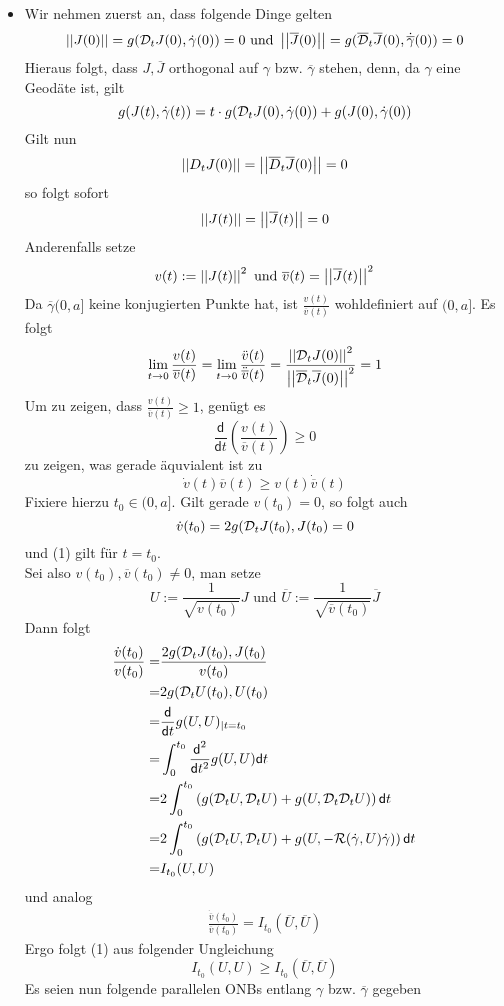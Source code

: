 \documentclass{book}
\renewcommand{\d}{\textsf{d}}
\renewcommand{\l}[1]{\overline{#1}}
\newcommand{\Rc}{\mathcal{R}}
\begin{document}
\begin{Beweis}{}
\begin{itemize}
\item Wir nehmen zuerst an, dass folgende Dinge gelten
\[ \norm{J(0)} = g(\D_t J(0), \dot{\gamma}(0)) = 0 \text{ und } \norm{\l J(0)} = g(\l \D_t \l J(0), \dot{\l \gamma}(0)) = 0 \]
Hieraus folgt, dass $J,\l J$ orthogonal auf $\gamma$ bzw. $\l \gamma$ stehen, denn, da $\gamma$ eine Geodäte ist, gilt
\[ g(J(t), \dot{\gamma}(t)) = t \cdot g(\mathcal{D}_tJ(0), \dot{\gamma}(0)) + g(J(0), \dot{\gamma}(0)) \]
Gilt nun
\[ \norm{D_t J(0)} = \norm{\l D_t \l J(0)} = 0 \]
so folgt sofort
\[\norm{J(t)} = \norm{\l J(t)} = 0 \]
Anderenfalls setze
\[ v(t) := \norm{J(t)}^2 \text{ und } \l v(t) = \norm{\l J(t)}^2 \]
Da $\l \gamma(0,a]$ keine konjugierten Punkte hat, ist $\frac{v(t)}{\l v(t)}$ wohldefiniert auf $(0,a]$. Es folgt
\[ \lim_{t \pfeil{} 0} \frac{v(t)}{\l v(t)} = \lim_{t \pfeil{} 0} \frac{\ddot{v}(t)}{\ddot{\l{v}}(t)} = \frac{\norm{\D_tJ(0)}^2}{\norm{\l \D_t \l J(0)}^2} = 1 \] 
Um zu zeigen, dass $\frac{v(t)}{\l v(t)} \geq 1$, genügt es
\[ \frac{\d}{\d t} (\frac{v(t)}{\l v(t)}) \geq 0 \]
zu zeigen, was gerade äquvialent ist zu
\[ \tag{1} \dot{v}(t) \l v(t) \geq v(t) \dot{\l v}(t) \]
Fixiere hierzu $t_0 \in (0,a]$. Gilt gerade $v(t_0) = 0$, so folgt auch
\[ \dot{v}(t_0) = 2g(\mathcal{D}_t J(t_0), J(t_0) = 0\]
und (1) gilt für $t = t_0$.\\
Sei also $v(t_0), \l v(t_0) \neq 0$, man setze
\[ U := \frac{1}{\sqrt{v(t_0)}}J \text{  und  } \l U :=  \frac{1}{\sqrt{\l v(t_0)}}\l J  \]
Dann folgt
\begin{align*}
\frac{\dot{v}(t_0)}{v(t_0)} =&\frac{2g(\D_tJ(t_0), J(t_0)}{v(t_0)}\\
=& 2g(\D_t U(t_0), U(t_0)\\
=& \frac{\d}{\d t}g(U,U)_{|t = t_0}\\
=& \int_{0}^{t_0} \frac{\d^2}{\d t^2}g(U,U) \d t\\
=& 2\int_{0}^{t_0} \klam{ g(\D_t U, \D_t U)  + g(U, \D_t \D_t U) } \d t\\
=& 2\int_{0}^{t_0} \klam{ g(\D_t U, \D_t U)  + g(U, - \Rc(\dot{\gamma}, U) \dot{\gamma} ) } \d t\\
=& I_{t_0}(U,U)
\end{align*}
und analog
\begin{align*}
\frac{\dot{\l v}(t_0)}{\l v(t_0)} =I_{t_0}(\l U,\l U)
\end{align*}
Ergo folgt (1) aus folgender Ungleichung
\[ I_{t_0}(U,U) \geq I_{t_0}(\l U, \l U) \]
Es seien nun folgende parallelen ONBs entlang $\gamma$ bzw. $\l \gamma$ gegeben

\end{itemize}
\end{Beweis}
\end{document}
